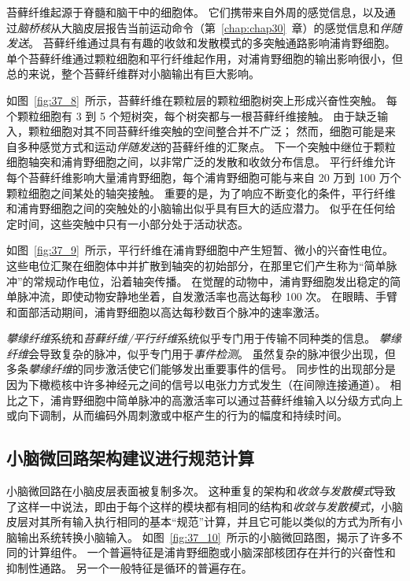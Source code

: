 苔藓纤维起源于脊髓和脑干中的细胞体。
它们携带来自外周的感觉信息，以及通过\textit{脑桥核}从大脑皮层报告当前运动命令（第~\ref{chap:chap30}~章）的感觉信息和\textit{伴随发送}。
苔藓纤维通过具有有趣的收敛和发散模式的多突触通路影响浦肯野细胞。
单个苔藓纤维通过颗粒细胞和平行纤维起作用，对浦肯野细胞的输出影响很小，但总的来说，整个苔藓纤维群对小脑输出有巨大影响。


如图~\ref{fig:37_8}~所示，苔藓纤维在颗粒层的颗粒细胞树突上形成兴奋性突触。
每个颗粒细胞有 3 到 5 个短树突，每个树突都与一根苔藓纤维接触。
由于缺乏输入，颗粒细胞对其不同苔藓纤维突触的空间整合并不广泛；
然而，细胞可能是来自多种感觉方式和运动\textit{伴随发送}的苔藓纤维的汇聚点。
下一个突触中继位于颗粒细胞轴突和浦肯野细胞之间，以非常广泛的发散和收敛分布信息。
平行纤维允许每个苔藓纤维影响大量浦肯野细胞，每个浦肯野细胞可能与来自 20 万到 100 万个颗粒细胞之间某处的轴突接触。
重要的是，为了响应不断变化的条件，平行纤维和浦肯野细胞之间的突触处的小脑输出似乎具有巨大的适应潜力。
似乎在任何给定时间，这些突触中只有一小部分处于活动状态。


如图~\ref{fig:37_9}~所示，平行纤维在浦肯野细胞中产生短暂、微小的兴奋性电位。
这些电位汇聚在细胞体中并扩散到轴突的初始部分，在那里它们产生称为“简单脉冲”的常规动作电位，沿着轴突传播。
在觉醒的动物中，浦肯野细胞发出稳定的简单脉冲流，即使动物安静地坐着，自发激活率也高达每秒 100 次。
在眼睛、手臂和面部活动期间，浦肯野细胞以高达每秒数百个脉冲的速率激活。


\textit{攀缘纤维}系统和\textit{苔藓纤维/平行纤维}系统似乎专门用于传输不同种类的信息。
\textit{攀缘纤维}会导致复杂的脉冲，似乎专门用于\textit{事件检测}。
虽然复杂的脉冲很少出现，但多条\textit{攀缘纤维}的同步激活使它们能够发出重要事件的信号。
同步性的出现部分是因为下橄榄核中许多神经元之间的信号以电张力方式发生（在间隙连接通道）。
相比之下，浦肯野细胞中简单脉冲的高激活率可以通过苔藓纤维输入以分级方式向上或向下调制，从而编码外周刺激或中枢产生的行为的幅度和持续时间。


\subsection{小脑微回路架构建议进行规范计算}

小脑微回路在小脑皮层表面被复制多次。
这种重复的架构和\textit{收敛与发散模式}导致了这样一中说法，即由于每个这样的模块都有相同的结构和\textit{收敛与发散模式}，小脑皮层对其所有输入执行相同的基本“规范”计算，并且它可能以类似的方式为所有小脑输出系统转换小脑输入。
如图~\ref{fig:37_10}~所示的小脑微回路图，揭示了许多不同的计算组件。
一个普遍特征是浦肯野细胞或小脑深部核团存在并行的兴奋性和抑制性通路。
另一个一般特征是循环的普遍存在。


